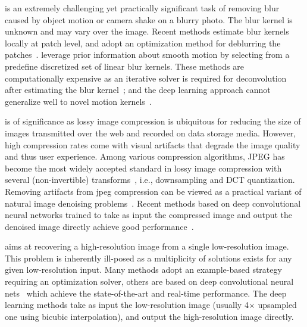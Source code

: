 \documentclass[10pt,twocolumn,letterpaper]{article}
\begin{document}
is an extremely challenging yet practically significant task of removing blur
caused by object motion or camera shake on a blurry photo. The blur kernel
is unknown and may vary over the image.  Recent methods estimate blur kernels
locally at patch level, and adopt an optimization method for deblurring the
patches~\cite{sun2015learning, bahat2017non}.
\cite{whyte2012non,hradivs2015convolutional,sun2015learning}
leverage prior information
about smooth motion by selecting from a predefine discretized set of linear
blur kernels.  These methods are computationally expensive as an iterative
solver is required for deconvolution after estimating the blur
kernel~\cite{cho2011handling};
and the deep learning approach cannot generalize well to novel motion
kernels~\cite{xu2014deep,sun2015learning,hradivs2015convolutional,schuler2016learning}.

 is of significance as lossy image
compression is ubiquitous for reducing the size of images transmitted over the
web and recorded on data storage media. However, high compression rates come
with visual artifacts that degrade the image quality and thus user experience.
Among various compression algorithms, JPEG has become the most widely accepted
standard in lossy image compression with several (non-invertible)
transforms~\cite{wallace1992jpeg}, i.e., downsampling and DCT quantization.
Removing artifacts from jpeg compression can be viewed as a practical variant
of natural image denoising problems~\cite{buades2005non, jain2009natural}.
Recent methods based on deep convolutional neural networks trained to take as
input the compressed image and output the denoised image directly achieve good
performance~\cite{dong2015compression,svoboda2016compression,cavigelli2017cas}.

 aims at recovering a
high-resolution image from a single low-resolution image. This problem is
inherently ill-posed as a multiplicity of solutions exists for any given
low-resolution input.  Many methods adopt an example-based
strategy~\cite{yang2014single} requiring an optimization solver, others are
based on deep convolutional neural nets~\cite{dong2016image,ledig2017photo}
which achieve the state-of-the-art and real-time performance.  The deep
learning methods take as input the low-resolution image (usually 4$\times$
upsampled one using bicubic interpolation), and output the high-resolution
image directly.
\end{document}
